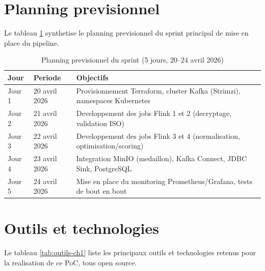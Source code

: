 \section{Planning previsionnel}
\label{sec:planning}

Le tableau \ref{tab:planning} synthetise le planning previsionnel du sprint principal
de mise en place du pipeline.

\begin{table}[H]
\centering
\renewcommand{\arraystretch}{1.3}
\begin{tabularx}{\textwidth}{@{} l l X @{}}
\toprule
\textbf{Jour} & \textbf{Periode} & \textbf{Objectifs} \\
\midrule
Jour 1 & 20 avril 2026 & Provisionnement Terraform, cluster Kafka (Strimzi), namespaces Kubernetes \\
\rowcolor{gray!6}
Jour 2 & 21 avril 2026 & Developpement des jobs Flink 1 et 2 (decryptage, validation ISO) \\
Jour 3 & 22 avril 2026 & Developpement des jobs Flink 3 et 4 (normalisation, optimisation/scoring) \\
\rowcolor{gray!6}
Jour 4 & 23 avril 2026 & Integration MinIO (medaillon), Kafka Connect, JDBC Sink, PostgreSQL \\
Jour 5 & 24 avril 2026 & Mise en place du monitoring Prometheus/Grafana, tests de bout en bout \\
\bottomrule
\end{tabularx}
\caption{Planning previsionnel du sprint (5 jours, 20--24 avril 2026)}
\label{tab:planning}
\end{table}

\section{Outils et technologies}
\label{sec:outils}

Le tableau \ref{tab:outils-ch1} liste les principaux outils et technologies retenus
pour la realisation de ce PoC, tous open source.

